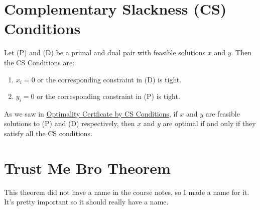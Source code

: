 \documentclass[a4paper]{report}
\begin{document}
	\section{Complementary Slackness (CS) Conditions}
	\begin{definition}
		Let (P) and (D) be a primal and dual pair with feasible solutions $x$ and $y$.
		Then the CS Conditions are:
		\begin{enumerate}
			\item $x_{i} = 0$ or the corresponding constraint in (D) is tight.

			\item $y_{i} = 0$ or the corresponding constraint in (P) is tight.
		\end{enumerate}
		As we saw in \hyperref[optimality:iii]{Optimality Certficate by CS
		Conditions}, if $x$ and $y$ are feasible solutions to (P) and (D)
		respectively, then $x$ and $y$ are optimal if and only if they satisfy all the
		CS conditions.
	\end{definition}

	\section{Trust Me Bro Theorem}
	This theorem did not have a name in the course notes, so I made a name for it.
	It's pretty important so it should really have a name.

	\newpage
\end{document}
